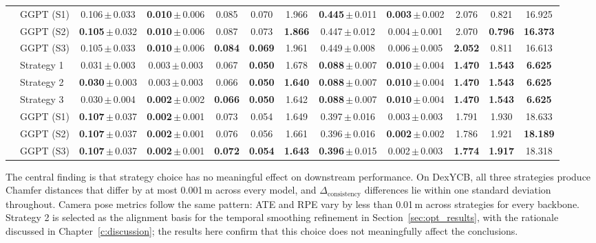 \begin{table}[!htb]
{\begin{tabular}{ll ccccc ccccc}
\cmidrule(l){2-12}
 & GGPT (S1) & 0.106\,$\pm$\,0.033 & \textbf{0.010}\,$\pm$\,0.006 & 0.085 & 0.070 & 1.966 & \textbf{0.445}\,$\pm$\,0.011 & \textbf{0.003}\,$\pm$\,0.002 & 2.076 & 0.821 & 16.925 \\
 & GGPT (S2) & \textbf{0.105}\,$\pm$\,0.032 & \textbf{0.010}\,$\pm$\,0.006 & 0.087 & 0.073 & \textbf{1.866} & 0.447\,$\pm$\,0.012 & 0.004\,$\pm$\,0.001 & 2.070 & \textbf{0.796} & \textbf{16.373} \\
 & GGPT (S3) & 0.105\,$\pm$\,0.033 & \textbf{0.010}\,$\pm$\,0.006 & \textbf{0.084} & \textbf{0.069} & 1.961 & 0.449\,$\pm$\,0.008 & 0.006\,$\pm$\,0.005 & \textbf{2.052} & 0.811 & 16.613 \\
\midrule
\addlinespace[0.15em]
\multirow{6}{*}{Pi3X}
 & Strategy 1 & 0.031\,$\pm$\,0.003 & 0.003\,$\pm$\,0.003 & 0.067 & \textbf{0.050} & 1.678 & \textbf{0.088}\,$\pm$\,0.007 & \textbf{0.010}\,$\pm$\,0.004 & \textbf{1.470} & \textbf{1.543} & \textbf{6.625} \\
 & Strategy 2 & \textbf{0.030}\,$\pm$\,0.003 & 0.003\,$\pm$\,0.003 & 0.066 & \textbf{0.050} & \textbf{1.640} & \textbf{0.088}\,$\pm$\,0.007 & \textbf{0.010}\,$\pm$\,0.004 & \textbf{1.470} & \textbf{1.543} & \textbf{6.625} \\
 & Strategy 3 & 0.030\,$\pm$\,0.004 & \textbf{0.002}\,$\pm$\,0.002 & \textbf{0.066} & \textbf{0.050} & 1.642 & \textbf{0.088}\,$\pm$\,0.007 & \textbf{0.010}\,$\pm$\,0.004 & \textbf{1.470} & \textbf{1.543} & \textbf{6.625} \\
\cmidrule(l){2-12}
 & GGPT (S1) & \textbf{0.107}\,$\pm$\,0.037 & \textbf{0.002}\,$\pm$\,0.001 & 0.073 & 0.054 & 1.649 & 0.397\,$\pm$\,0.016 & 0.003\,$\pm$\,0.003 & 1.791 & 1.930 & 18.633 \\
 & GGPT (S2) & \textbf{0.107}\,$\pm$\,0.037 & \textbf{0.002}\,$\pm$\,0.001 & 0.076 & 0.056 & 1.661 & 0.396\,$\pm$\,0.016 & \textbf{0.002}\,$\pm$\,0.002 & 1.786 & 1.921 & \textbf{18.189} \\
 & GGPT (S3) & \textbf{0.107}\,$\pm$\,0.037 & \textbf{0.002}\,$\pm$\,0.001 & \textbf{0.072} & \textbf{0.054} & \textbf{1.643} & \textbf{0.396}\,$\pm$\,0.015 & 0.002\,$\pm$\,0.003 & \textbf{1.774} & \textbf{1.917} & 18.318 \\
\bottomrule
\end{tabular}
}
\end{table}


The central finding is that strategy choice has no meaningful effect on 
downstream performance. On DexYCB, all three strategies produce Chamfer 
distances that differ by at most 0.001\,m across every model, and 
$\Delta_{\text{consistency}}$ differences lie within one standard deviation 
throughout. Camera pose metrics follow the same pattern: ATE and RPE vary by 
less than 0.01\,m across strategies for every backbone. Strategy 2 is selected 
as the alignment basis for the temporal smoothing refinement in 
Section~\ref{sec:opt_results}, with the rationale discussed in 
Chapter~\ref{c:discussion}; the results here confirm that this choice does not 
meaningfully affect the conclusions.

